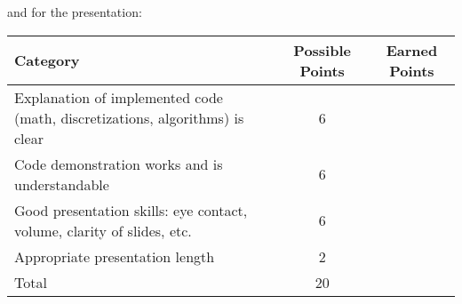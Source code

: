 \documentclass[a4paper, 12 pt]{curve}
\begin{document}
\vspace*{1 em}
and for the presentation:
\begin{center}
\begin{tabu}{| X | c | c |}\hline
\textbf{Category} & \textbf{Possible Points} & \textbf{Earned Points} \\ \hline \hline
Explanation of implemented code (math, discretizations, algorithms) is clear & 6 & \\ \hline
Code demonstration works and is understandable & 6 & \\ \hline
Good presentation skills: eye contact, volume, clarity of slides, etc. & 6 & \\ \hline
Appropriate presentation length & 2 & \\ \hline
Total & 20 & \\\hline
\end{tabu} 
\end{center}
\end{document}
